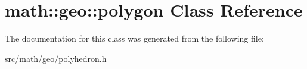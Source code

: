 \hypertarget{classmath_1_1geo_1_1polygon}{
\section{math::geo::polygon Class Reference}
\label{classmath_1_1geo_1_1polygon}
}


The documentation for this class was generated from the following file:\begin{DoxyCompactItemize}
\item 
src/math/geo/polyhedron.h\end{DoxyCompactItemize}
